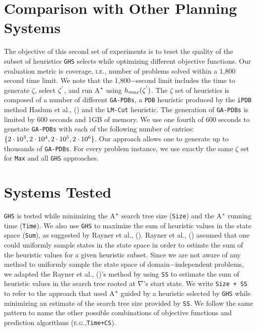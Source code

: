\section{Comparison with Other Planning Systems}
\noindent
The objective of this second set of experiments is to teset the quality of the subset of heuristics \texttt{GHS} selects while optimizing different objective functions. Our evaluation metric is coverage, \textsc{i.e.,} number of problems solved within a 1,800 second time limit. We note that the 1,800$-$second limit includes the time to generate $\zeta$, select $\zeta\sp{'}$, and run A$\sp{*}$ using $h_{max}(\zeta\sp{'})$. The $\zeta$ set of heuristics is composed of a number of different \texttt{GA-PDBs}, a \texttt{PDB} heuristic produced by the \texttt{iPDB} method Haslum et al., (\citeyear{haslum2007domain}) and the \texttt{LM-Cut} heuristic. The generation of \texttt{GA-PDBs} is limited by 600 seconds and 1GB of memory. We use one fourth of 600 seconds to genetate \texttt{GA-PDBs} with each of the following number of entries: $\{2 \cdot 10\sp{3}, 2 \cdot 10\sp{4}, 2 \cdot 10\sp{5}, 2 \cdot 10\sp{6}\}$. Our approach allows one to generate up to thousands of \texttt{GA-PDBs}. For every problem instance, we use exactly the same $\zeta$ set for \texttt{Max} and all \texttt{GHS} approaches.

\section{Systems Tested}
\noindent
\texttt{GHS} is tested while minimizing the A$\sp{*}$ search tree size (\texttt{Size}) and the A$\sp{*}$ running time (\texttt{Time}). We also use \texttt{GHS} to maximize the sum of heuristic values in the state space (\texttt{Sum}), as suggested by Rayner et al., (\citeyear{raynersss13}). Rayner et al., (\citeyear{raynersss13}) assumed that one could uniformly sample states in the state space in order to estimte the sum of the heuristic values for a given heuristic subset. Since we are not aware of any method to uniformly sample the state space of domain$-$independent problems, we adapted the Rayner et al., (\citeyear{raynersss13})'s method by using \texttt{SS} to estimate the sum of heuristic values in the search tree rooted at $\nabla$'s start state. We write \texttt{Size + SS} to refer to the approach that used A$\sp{*}$ guided by a heuristic selected by \texttt{GHS} while minimizing an estimate of the search tree size provided by \texttt{SS}. We follow the same pattern to name the other possible combinations of objective functions and prediction algorithms (\textsc{e.g.,}\texttt{Time+CS}).


